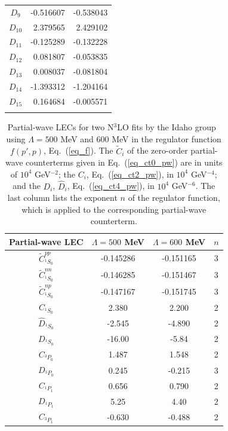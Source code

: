 \documentclass[sort&compress,preprint,3p]{elsarticle}
\begin{document}
\begin{table}[t]
\begin{tabular*}{\textwidth}{@{\extracolsep{\fill}}crr}
 $D_9$ &   -0.516607 &  -0.538043 \\
$D_{10}$ &      2.379565 & 2.429102 \\
$D_{11}$ &   -0.125289 &  -0.132228 \\
$D_{12}$ &  0.081807 & -0.053835 \\
 $D_{13}$ &   0.008037 & -0.081804 \\
$D_{14}$ &     -1.393312 &  -1.204164 \\
 $D_{15}$ &      0.164684 &   -0.005571 \\
\hline
\hline
\noalign{\smallskip}
\end{tabular*}
\end{table}


\begin{table}[t]
\caption{Partial-wave LECs 
for two N$^3$LO fits by the Idaho group~\cite{EM03} using $\Lambda=500$ MeV
and 600 MeV in the regulator function $f(p',p)$, Eq.~(\ref{eq_f}).
The  $\widetilde{C}_i$ of the zero-order partial-wave counterterms given in Eq.~(\ref{eq_ct0_pw}) 
are in units of $10^4$ GeV$^{-2}$;
the $C_i$, Eq.~(\ref{eq_ct2_pw}), in $10^4$ GeV$^{-4}$; 
and the $D_i$, $\widehat{D}_i$, Eq.~(\ref{eq_ct4_pw}),
 in $10^4$ GeV$^{-6}$. The last column lists the exponent $n$ 
 of the regulator function, which is
 applied to the corresponding partial-wave counterterm.
 \label{tab_LEC_ct2}}
\smallskip
\begin{tabular*}{\textwidth}{@{\extracolsep{\fill}}cccc}
\hline 
\hline 
\noalign{\smallskip}
Partial-wave LEC & $\Lambda = 500$ MeV & $\Lambda =600$ MeV & $n$ 
 \\
 \hline
  $\widetilde{C}_{^1S_0}^{pp}$ &  -0.145286  & -0.151165 & 3 \\
  $\widetilde{C}_{^1S_0}^{nn}$ &  -0.146285  & -0.151467 & 3 \\
 $\widetilde{C}_{^1S_0}^{np}$ &  -0.147167  & -0.151745 & 3 \\
$C_{^1S_0}$  &  2.380    & 2.200 & 2 \\
$\widehat{D}_{^1S_0}$  & -2.545   & -4.890 & 2 \\
$D_{^1S_0}$  &-16.00 & -5.84  &     2 \\
$C_{^3P_0}$   & 1.487   & 1.548 & 2 \\ 
 $D_{^3P_0}$   & 0.245   & -0.215& 3 \\
  $C_{^1P_1}$   & 0.656    & 0.790 & 2 \\
  $D_{^1P_1}$   & 5.25     & 4.40 & 2 \\
  $C_{^3P_1}$   &-0.630     & -0.488 & 2 \\

\end{tabular*}
\end{table}
\end{document}
